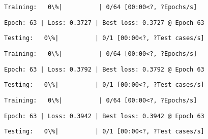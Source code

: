 \documentclass[11pt]{article}
\begin{document}
    
    
    \begin{Verbatim}[commandchars=\\\{\}]
Training:   0\%|          | 0/64 [00:00<?, ?Epochs/s]
    \end{Verbatim}

    
    \begin{Verbatim}[commandchars=\\\{\}]
Epoch: 63 | Loss: 0.3727 | Best loss: 0.3727 @ Epoch 63
    \end{Verbatim}

    
    \begin{Verbatim}[commandchars=\\\{\}]
Testing:   0\%|          | 0/1 [00:00<?, ?Test cases/s]
    \end{Verbatim}

    
    
    \begin{Verbatim}[commandchars=\\\{\}]
Training:   0\%|          | 0/64 [00:00<?, ?Epochs/s]
    \end{Verbatim}

    
    \begin{Verbatim}[commandchars=\\\{\}]
Epoch: 63 | Loss: 0.3792 | Best loss: 0.3792 @ Epoch 63
    \end{Verbatim}

    
    \begin{Verbatim}[commandchars=\\\{\}]
Testing:   0\%|          | 0/1 [00:00<?, ?Test cases/s]
    \end{Verbatim}

    
    
    \begin{Verbatim}[commandchars=\\\{\}]
Training:   0\%|          | 0/64 [00:00<?, ?Epochs/s]
    \end{Verbatim}

    
    \begin{Verbatim}[commandchars=\\\{\}]
Epoch: 63 | Loss: 0.3942 | Best loss: 0.3942 @ Epoch 63
    \end{Verbatim}

    
    \begin{Verbatim}[commandchars=\\\{\}]
Testing:   0\%|          | 0/1 [00:00<?, ?Test cases/s]
    \end{Verbatim}
\end{document}
